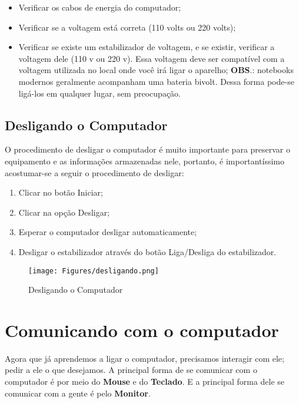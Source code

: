\documentclass[hidelinks,12pt]{article}
\begin{document}
\begin{itemize}
    \item Verificar os cabos de energia do computador;
    
    \item Verificar se a voltagem está correta (110 volts ou 220 volts);
    
    \item Verificar se existe um estabilizador de voltagem, e se existir, verificar a voltagem dele (110 v ou 220 v). Essa voltagem deve ser compatível com a voltagem utilizada no local onde você irá ligar o aparelho;
    \textbf{OBS}.: notebooks modernos geralmente acompanham uma bateria bivolt. Dessa forma pode-se ligá-los em qualquer lugar, sem preocupação.
\end{itemize}


\subsection{Desligando o Computador}
O procedimento de desligar o computador é muito importante para preservar o equipamento e as informações armazenadas nele, portanto, é importantíssimo acostumar-se a seguir o procedimento de desligar:

\begin{enumerate}
	\item Clicar no botão Iniciar;

	\item Clicar na opção Desligar;

	\item Esperar o computador desligar automaticamente;

	\item Desligar o estabilizador através do botão Liga/Desliga do estabilizador.
\end{enumerate}

\begin{figure}[!h]
	\centering
	\texttt{[image: Figures/desligando.png]}
	\caption{Desligando o Computador}
	\label{fig:desligando}
\end{figure}

\newpage

\section{Comunicando com o computador}

Agora que já aprendemos a ligar o computador, precisamos interagir com ele; pedir a ele o que desejamos. A principal forma de se comunicar com o computador é por meio do \textbf{Mouse} e do \textbf{Teclado}. E a principal forma dele se comunicar com a gente é pelo \textbf{Monitor}.
\end{document}
